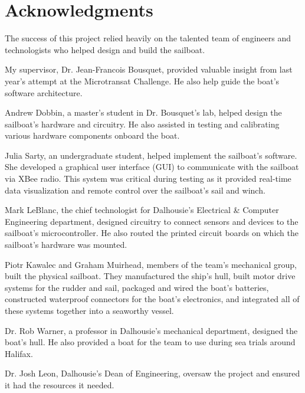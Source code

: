 \documentclass[12pt]{article}
\begin{document}
\tableofcontents

\clearpage

\listoffigures
{}

\clearpage

\section*{Acknowledgments}
The success of this project relied heavily on the talented team of engineers and technologists who helped design and build the sailboat. 

My supervisor, Dr. Jean-Francois Bousquet, provided valuable insight from last year's attempt at the Microtransat Challenge. He also help guide the boat's software architecture. 

Andrew Dobbin, a master's student in Dr. Bousquet's lab, helped design the sailboat's hardware and circuitry. He also assisted in testing and calibrating various hardware components onboard the boat. 

Julia Sarty, an undergraduate student, helped implement the sailboat's software. She developed a graphical user interface (GUI) to communicate with the sailboat via XBee radio. This system was critical during testing as it provided real-time data visualization and remote control over the sailboat's sail and winch.

Mark LeBlanc, the chief technologist for Dalhousie's Electrical \& Computer Engineering department, designed circuitry to connect sensors and devices to the sailboat's microcontroller. He also routed the printed circuit boards on which the sailboat's hardware was mounted.

Piotr Kawalec and Graham Muirhead, members of the team's mechanical group, built the physical sailboat. They manufactured the ship's hull, built motor drive systems for the rudder and sail, packaged and wired the boat's batteries, constructed waterproof connectors for the boat's electronics, and integrated all of these systems together into a seaworthy vessel. 

Dr. Rob Warner, a professor in Dalhousie's mechanical department, designed the boat's hull. He also provided a boat for the team to use during sea trials around Halifax.

Dr. Josh Leon, Dalhousie's Dean of Engineering, oversaw the project and ensured it had the resources it needed.

\clearpage
\end{document}

